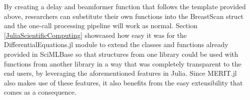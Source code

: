 By creating a delay and beamformer function that follows the template provided above, researchers can substitute their
own functions into the BreastScan struct and the one-call processing pipeline will work as normal. Section
\ref{JuliaScientificComputing} showcased how easy it was for the DifferentialEquations.jl module to extend the classes
and functions already provided in SciMLBase so that structures from one library could be used with functions from another
library in a way that was completely transparent to the end users, by leveraging the aforementioned features in Julia.
Since MERIT.jl also makes use of these features, it also benefits from the easy extensibility that comes as a
consequence.